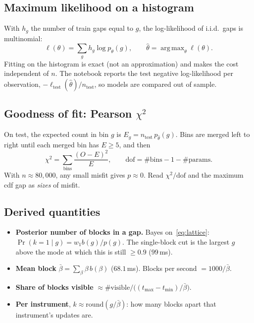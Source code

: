 \documentclass[11pt,a4paper]{article}
\newcommand{\code}[1]{\texttt{\detokenize{#1}}}
\DeclareMathOperator*{\argmax}{arg\,max}
\begin{document}
\subsection{Maximum likelihood on a histogram}
With $h_g$ the number of train gaps equal to $g$, the log-likelihood of i.i.d.\ gaps is multinomial:
\begin{equation}
  \ell(\theta) = \sum_{g} h_g \log p_\theta(g),\qquad \hat\theta=\argmax_\theta \ell(\theta).
\end{equation}
Fitting on the histogram is exact (not an approximation) and makes the cost independent of $n$. The notebook reports the test negative log-likelihood per observation,
$-\ell_{\text{test}}(\hat\theta)/n_{\text{test}}$, so models are compared out of sample.

\subsection{Goodness of fit: Pearson $\chi^2$}
On test, the expected count in bin $g$ is $E_g=n_{\text{test}}\,p_{\hat\theta}(g)$. Bins are merged left to right until each merged bin has $E\ge5$, and then
\begin{equation}
  \chi^2=\sum_{\text{bins}}\frac{(O-E)^2}{E},\qquad \text{dof}= \#\text{bins}-1-\#\text{params}.
\end{equation}
With $n\approx80{,}000$, any small misfit gives $p\approx0$. Read $\chi^2/\text{dof}$ and the maximum cdf gap as \emph{sizes} of misfit.

\subsection{Derived quantities}
\begin{itemize}
  \item \textbf{Posterior number of blocks in a gap.} Bayes on~\eqref{eq:lattice}:
        $\Pr(k=1\mid g)=w_1 b(g)\big/p(g)$. The single-block cut \code{SINGLE_MAX} is the largest $g$ above the mode at which this is still $\ge0.9$ ($99$\,ms).
  \item \textbf{Mean block} $\bar\beta=\sum_\beta \beta\,b(\beta)$ ($68.1$\,ms). Blocks per second $=1000/\bar\beta$.
  \item \textbf{Share of blocks visible} $\approx \#\text{visible}\big/\bigl((t_{\max}-t_{\min})/\bar\beta\bigr)$.
  \item \textbf{Per instrument}, $k\approx\mathrm{round}(g/\bar\beta)$: how many blocks apart that instrument's updates are.
\end{itemize}
\end{document}
